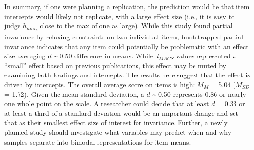 \documentclass[
  man]{apa7}
\newenvironment{Shaded}{\begin{snugshade}}{\end{snugshade}}
\newcommand{\AttributeTok}[1]{\textcolor[rgb]{0.13,0.29,0.53}{#1}}
\newcommand{\DecValTok}[1]{\textcolor[rgb]{0.00,0.00,0.81}{#1}}
\newcommand{\FunctionTok}[1]{\textcolor[rgb]{0.13,0.29,0.53}{\textbf{#1}}}
\newcommand{\NormalTok}[1]{#1}
\newcommand{\OtherTok}[1]{\textcolor[rgb]{0.56,0.35,0.01}{#1}}
\newcommand{\SpecialCharTok}[1]{\textcolor[rgb]{0.81,0.36,0.00}{\textbf{#1}}}
\newcommand{\StringTok}[1]{\textcolor[rgb]{0.31,0.60,0.02}{#1}}
\begin{document}
In summary, if one were planning a replication, the prediction would be that item intercepts would likely not replicate, with a large effect size (i.e., it is easy to judge \(h_{nmi_p}\) close to the max of one as large). While this study found partial invariance by relaxing constraints on two individual items, bootstrapped partial invariance indicates that any item could potentially be problematic with an effect size averaging \(d\) \textasciitilde{} 0.50 difference in means. While \(d_{MACS}\) values represented a ``small'' effect based on previous publications, this effect may be muted by examining both loadings and intercepts. The results here suggest that the effect is driven by intercepts. The overall average score on items is high: \(M_M\) = 5.04 (\(M_{SD}\) = 1.72). Given the mean standard deviation, a \(d\) \textasciitilde{} 0.50 represents 0.86 or nearly one whole point on the scale. A researcher could decide that at least \(d\) = 0.33 or at least a third of a standard deviation would be an important change and set that as their smallest effect size of interest for invariance. Further, a newly planned study should investigate what variables may predict when and why samples separate into bimodal representations for item means.

\normalsize

\begin{Shaded}
\end{Shaded}
\end{document}
